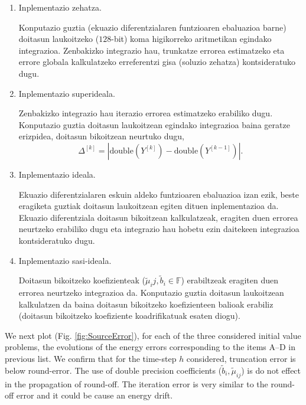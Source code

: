 \begin{enumerate}

\item Inplementazio zehatza.

Konputazio guztia (ekuazio diferentzialaren funtzioaren ebaluazioa barne) doitasun laukoitzeko ($128$-bit) koma higikorreko aritmetikan  egindako integrazioa. Zenbakizko integrazio hau, trunkatze errorea estimatzeko eta errore globala kalkulatzeko erreferentzi gisa (soluzio zehatza) kontsideratuko dugu. 

\item Inplementazio superideala.

Zenbakizko integrazio hau iterazio errorea estimatzeko erabiliko dugu. Konputazio guztia doitasun laukoitzean egindako integrazioa baina geratze erizpidea, doitasun bikoitzean neurtuko dugu,
\begin{equation*}
\Delta^{[k]}=|\text{double}(Y^{[k]})-\text{double}(Y^{[k-1]})|.
\end{equation*}

\item Inplementazio ideala.

Ekuazio diferentzialaren eskuin aldeko funtzioaren ebaluazioa izan ezik, beste eragiketa guztiak doitasun laukoitzean egiten dituen inplementazioa da. Ekuazio diferentziala doitasun bikoitzean kalkulatzeak, eragiten duen errorea neurtzeko erabiliko dugu eta integrazio hau hobetu ezin daitekeen integrazioa kontsideratuko dugu.  

\item Inplementazio sasi-ideala.

Doitasun bikoitzeko koefizienteak ($\tilde{\mu}_ij,\tilde{b}_i \in \mathbb{F}$) erabiltzeak eragiten duen errorea neurtzeko integrazioa da. Konputazio guztia doitasun laukoitzean kalkulatzen da baina doitasun bikoitzeko koefizienteen balioak erabiliz (doitasun bikoitzeko koefiziente koadrifikatuak esaten diogu). 

\end{enumerate}

We next plot (Fig. \ref{fig:SourceError}), for each of the three considered initial value problems, the evolutions of the energy errors corresponding to the items A--D in previous list. We confirm that for the time-step $h$ considered, truncation error is below round-error. The use of double precision coefficients ($\tilde{b}_i, \tilde{\mu}_{ij}$) is do not effect in the propagation of round-off. The iteration error is very similar to the round-off error and it could be cause an energy drift. 

